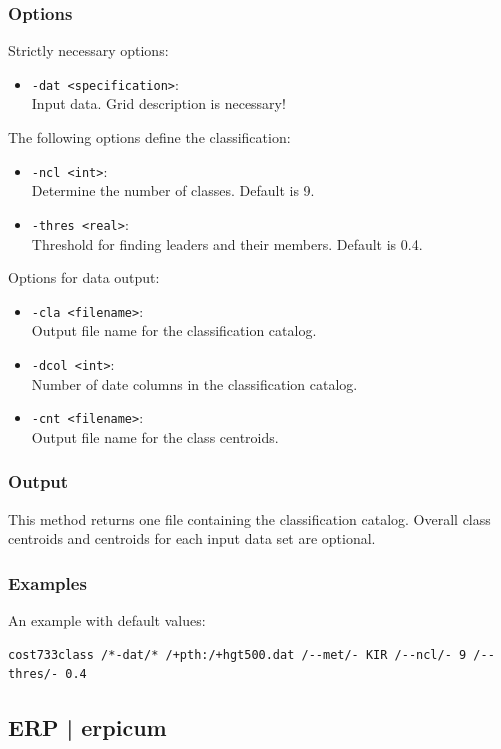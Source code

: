 \documentclass[12pt, oneside, a4paper, headsepline, plainheadsepline]{scrbook}
\begin{document}
\subsubsection*{Options}
Strictly necessary options:
\begin{itemize}
 \item \verb+-dat <specification>+:\\ Input data. Grid description is necessary!
\end{itemize}
The following options define the classification:
\begin{itemize}
 \item \verb+-ncl <int>+:\\ Determine the number of classes. Default is 9.
 \item \verb+-thres <real>+:\\ Threshold for finding leaders and their members. Default is 0.4.
\end{itemize}
Options for data output:
\begin{itemize}
 \item \verb+-cla <filename>+:\\ Output file name for the classification catalog.
 \item \verb+-dcol <int>+:\\ Number of date columns in the classification catalog.
 \item \verb+-cnt <filename>+:\\ Output file name for the class centroids.
\end{itemize}

\subsubsection*{Output}
This method returns one file containing the classification catalog. 
Overall class centroids and centroids for each input data set are optional.

\subsubsection*{Examples}
An example with default values:
\begin{lstlisting}
cost733class /*-dat/* /+pth:/+hgt500.dat /--met/- KIR /--ncl/- 9 /--thres/- 0.4 
\end{lstlisting}

\subsection{ERP | erpicum }
\end{document}
